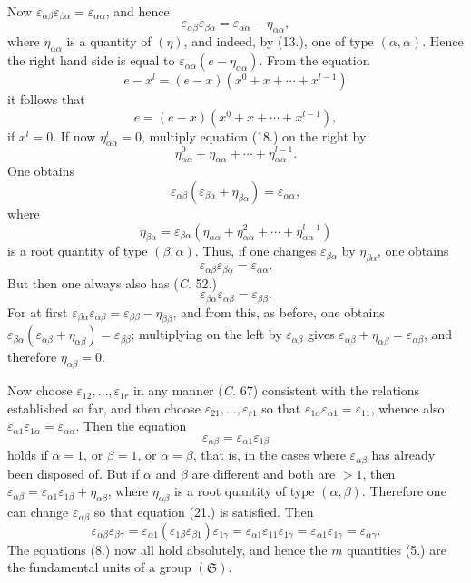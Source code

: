 \documentclass[11pt]{article}
\newcommand{\eps}{\varepsilon}
\newcommand{\grS}{\mathfrak{S}}
\begin{document}
Now $\eps_{\alpha\beta}\eps_{\beta\alpha}=\eps_{\alpha\alpha}$, and hence
\begin{equation}\tag{18.}
 \eps_{\alpha\beta}\eps_{\beta\alpha}=\eps_{\alpha\alpha}-\eta_{\alpha\alpha},
\end{equation}
where $\eta_{\alpha\alpha}$ is a quantity of $(\eta)$, and indeed, by (13.), one of type $(\alpha,\alpha)$. Hence the right hand side is equal to $\eps_{\alpha\alpha}(e-\eta_{\alpha\alpha})$. From the equation
\[
 e-x^l=(e-x)(x^0+x+\cdots+x^{l-1})
\]
it follows that
\[
 e=(e-x)(x^0+x+\cdots+x^{l-1}),
\]
if $x^l=0$. If now $\eta_{\alpha\alpha}^l=0$, multiply equation (18.) on the right by
\[
 \eta_{\alpha\alpha}^{0}+\eta_{\alpha\alpha}+\cdots+\eta_{\alpha\alpha}^{l-1}.
\]
One obtains
\[
 \eps_{\alpha\beta}(\eps_{\beta\alpha}+\eta_{\beta\alpha})=\eps_{\alpha\alpha},
\]
where
\[
 \eta_{\beta\alpha}=\eps_{\beta\alpha}(\eta_{\alpha\alpha}+\eta_{\alpha\alpha}^2+\cdots+\eta_{\alpha\alpha}^{l-1})
\]
is a root quantity of type $(\beta,\alpha)$. Thus, if one changes $\eps_{\beta\alpha}$ by $\eta_{\beta\alpha}$, one obtains
\begin{equation}\tag{19.}
 \eps_{\alpha\beta}\eps_{\beta\alpha}=\eps_{\alpha\alpha}.
\end{equation}
But then one always also has (\emph{C.} 52.)
\begin{equation}\tag{20.}
 \eps_{\beta\alpha}\eps_{\alpha\beta}=\eps_{\beta\beta}.
\end{equation}
For at first $\eps_{\beta\alpha}\eps_{\alpha\beta}=\eps_{\beta\beta}-\eta_{\beta\beta}$, and from this, as before, one obtains $\eps_{\beta\alpha}(\eps_{\alpha\beta}+\eta_{\alpha\beta})=\eps_{\beta\beta}$; multiplying on the left by $\eps_{\alpha\beta}$ gives $\eps_{\alpha\beta}+\eta_{\alpha\beta}=\eps_{\alpha\beta}$, and therefore $\eta_{\alpha\beta}=0$.

Now choose $\eps_{12},\ldots,\eps_{1r}$ in any manner (\emph{C.} 67) consistent with the relations established so far, and then choose $\eps_{21},\ldots,\eps_{r1}$ so that $\eps_{1\alpha}\eps_{\alpha1}=\eps_{11}$, whence also $\eps_{\alpha1}\eps_{1\alpha}=\eps_{\alpha\alpha}$. Then the equation
\begin{equation}\tag{21.}
 \eps_{\alpha\beta}=\eps_{\alpha1}\eps_{1\beta}
\end{equation}
holds if $\alpha=1$, or $\beta=1$, or $\alpha=\beta$, that is, in the cases where $\eps_{\alpha\beta}$ has already been disposed of. But if $\alpha$ and $\beta$ are different and both are $>1$, then $\eps_{\alpha\beta}=\eps_{\alpha1}\eps_{1\beta}+\eta_{\alpha\beta}$, where $\eta_{\alpha\beta}$ is a root quantity of type $(\alpha,\beta)$. Therefore one can change $\eps_{\alpha\beta}$ so that equation (21.) is satisfied. Then
\[
 \eps_{\alpha\beta}\eps_{\beta\gamma}
 =\eps_{\alpha1}(\eps_{1\beta}\eps_{\beta1})\eps_{1\gamma}
 =\eps_{\alpha1}\eps_{11}\eps_{1\gamma}
 =\eps_{\alpha1}\eps_{1\gamma}
 =\eps_{\alpha\gamma}.
\]
The equations (8.) now all hold absolutely, and hence the $m$ quantities (5.) are the fundamental units of a group $(\grS)$.
\end{document}
